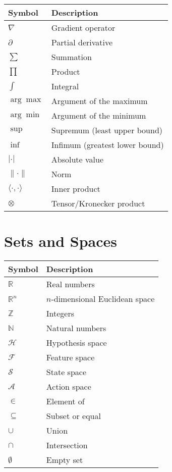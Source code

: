 \begin{tabular}{ll}
\toprule
\textbf{Symbol}  & \textbf{Description} \\
\midrule
$\nabla$ & Gradient operator \\
$\partial$ & Partial derivative \\
$\sum$ & Summation \\
$\prod$ & Product \\
$\int$ & Integral \\
$\arg\max$ & Argument of the maximum \\
$\arg\min$ & Argument of the minimum \\
$\sup$ & Supremum (least upper bound) \\
$\inf$ & Infimum (greatest lower bound) \\
$|\cdot|$ & Absolute value \\
$\|\cdot\|$ & Norm \\
$\langle \cdot, \cdot \rangle$ & Inner product \\
$\otimes$ & Tensor/Kronecker product \\
\bottomrule
\end{tabular}

\section*{Sets and Spaces}

\begin{tabular}{ll}
\toprule
\textbf{Symbol}  & \textbf{Description} \\
\midrule
$\mathbb{R}$ & Real numbers \\
$\mathbb{R}^n$ & $n$-dimensional Euclidean space \\
$\mathbb{Z}$ & Integers \\
$\mathbb{N}$ & Natural numbers \\
$\mathcal{H}$ & Hypothesis space \\
$\mathcal{F}$ & Feature space \\
$\mathcal{S}$ & State space \\
$\mathcal{A}$ & Action space \\
$\in$ & Element of \\
$\subseteq$ & Subset or equal \\
$\cup$ & Union \\
$\cap$ & Intersection \\
$\emptyset$ & Empty set \\
\bottomrule
\end{tabular}

